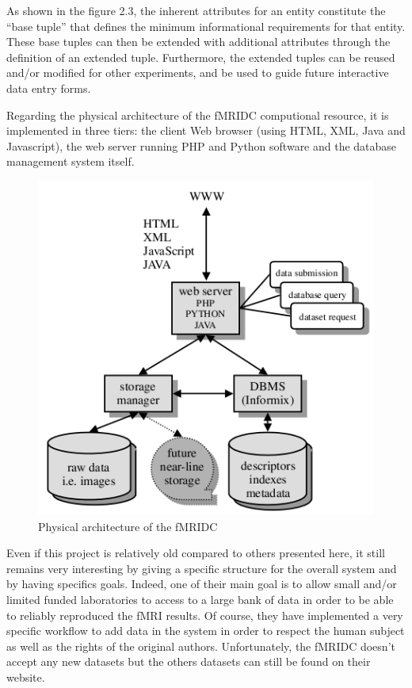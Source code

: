 \par
As shown in the figure 2.3, the inherent attributes for an entity constitute the ``base tuple'' that defines the minimum informational requirements for that entity. These base tuples can then be extended with additional attributes through the definition of an extended tuple. Furthermore, the extended tuples can be reused and/or modified for other experiments, and be used to guide future interactive data entry forms.
\par
Regarding the physical architecture of the fMRIDC computional resource, it is implemented in three tiers: the client Web browser (using HTML, XML, Java and Javascript), the web server running PHP and Python software and the database management system itself.
\begin{figure}[!h]
\begin{center}
\includegraphics[scale=0.7]{images/fMRIDC_architecture.png}
\caption{\small Physical architecture of the fMRIDC\protect\footnotemark}
\end{center}
\end{figure}
\par
Even if this project is relatively old compared to others presented here, it still remains very interesting by giving a specific structure for the overall system and by having specifics goals. Indeed, one of their main goal is to allow small and/or limited funded laboratories to access to a large bank of data in order to be able to reliably reproduced the fMRI results. Of course, they have implemented a very specific workflow to add data in the system in order to respect the human subject as well as the rights of the original authors. Unfortunately, the fMRIDC doesn't accept any new datasets but the others datasets can still be found on their website.
